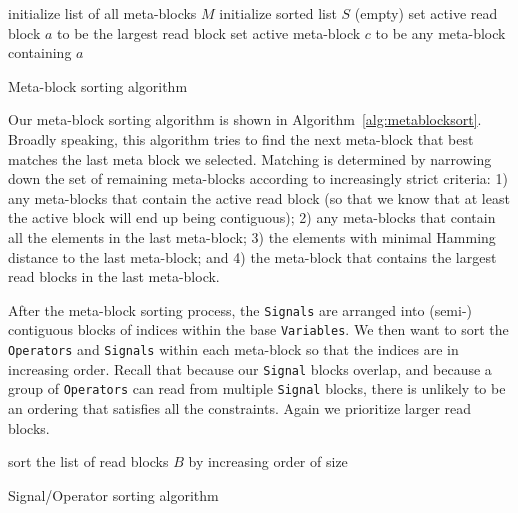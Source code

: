\documentclass{article}
\begin{document}
\begin{algorithm}
\DontPrintSemicolon
initialize list of all meta-blocks $M$\;
initialize sorted list $S$ (empty)\;
set active read block $a$ to be the largest read block\;
set active meta-block $c$ to be any meta-block containing $a$\;
\caption{Meta-block sorting algorithm}
\label{alg:metablocksort}
\end{algorithm}

Our meta-block sorting algorithm is shown in Algorithm~\ref{alg:metablocksort}.  Broadly speaking, this algorithm tries to find the next meta-block that best matches the last meta block we selected.  Matching is determined by narrowing down the set of remaining meta-blocks according to increasingly strict criteria: 1) any meta-blocks that contain the active read block (so that we know that at least the active block will end up being contiguous); 2) any meta-blocks that contain all the elements in the last meta-block; 3) the elements with minimal Hamming distance to the last meta-block; and 4) the meta-block that contains the largest read blocks in the last meta-block.

After the meta-block sorting process, the \texttt{Signals} are arranged into (semi-) contiguous blocks of indices within the base \texttt{Variables}.  We then want to sort the \texttt{Operators} and \texttt{Signals} within each meta-block so that the indices are in increasing order.  Recall that because our \texttt{Signal} blocks overlap, and because a group of \texttt{Operators} can read from multiple \texttt{Signal} blocks, there is unlikely to be an ordering that satisfies all the constraints.  Again we prioritize larger read blocks.

\begin{algorithm}
\DontPrintSemicolon
sort the list of read blocks $B$ by increasing order of size\;
\caption{Signal/Operator sorting algorithm}
\label{alg:sigopsort}
\end{algorithm}
\end{document}
